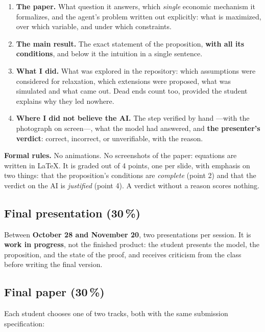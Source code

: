 \documentclass[11pt]{article}
\begin{document}
\begin{enumerate}
\item \textbf{The paper.} What question it answers, which \emph{single} economic mechanism it formalizes, and the agent's problem written out explicitly: what is maximized, over which variable, and under which constraints.
\item \textbf{The main result.} The exact statement of the proposition, \textbf{with all its conditions}, and below it the intuition in a single sentence.
\item \textbf{What I did.} What was explored in the repository: which assumptions were considered for relaxation, which extensions were proposed, what was simulated and what came out. Dead ends count too, provided the student explains why they led nowhere.
\item \textbf{Where I did not believe the AI.} The step verified by hand ---with the photograph on screen---, what the model had answered, and \textbf{the presenter's verdict}: correct, incorrect, or unverifiable, with the reason.
\end{enumerate}

\textbf{Formal rules.} No animations. No screenshots of the paper: equations are written in \LaTeX. It is graded out of 4 points, one per slide, with emphasis on two things: that the proposition's conditions are \emph{complete} (point 2) and that the verdict on the AI is \emph{justified} (point 4). A verdict without a reason scores nothing.

\subsection*{Final presentation (30\,\%)}

Between \textbf{October 28 and November 20}, two presentations per session. It is \textbf{work in progress}, not the finished product: the student presents the model, the proposition, and the state of the proof, and receives criticism from the class before writing the final version.

\subsection*{Final paper (30\,\%)}

Each student chooses one of two tracks, both with the same submission specification:
\end{document}
